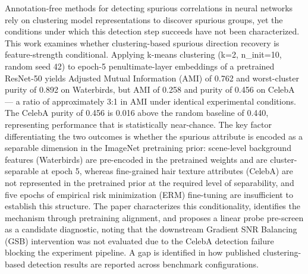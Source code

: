 
Annotation-free methods for detecting spurious correlations in neural networks rely on clustering model representations to discover spurious groups, yet the conditions under which this detection step succeeds have not been characterized. This work examines whether clustering-based spurious direction recovery is feature-strength conditional. Applying k-means clustering (k=2, n_init=10, random seed 42) to epoch-5 penultimate-layer embeddings of a pretrained ResNet-50 yields Adjusted Mutual Information (AMI) of 0.762 and worst-cluster purity of 0.892 on Waterbirds, but AMI of 0.258 and purity of 0.456 on CelebA — a ratio of approximately 3:1 in AMI under identical experimental conditions. The CelebA purity of 0.456 is 0.016 above the random baseline of 0.440, representing performance that is statistically near-chance. The key factor differentiating the two outcomes is whether the spurious attribute is encoded as a separable dimension in the ImageNet pretraining prior: scene-level background features (Waterbirds) are pre-encoded in the pretrained weights and are cluster-separable at epoch 5, whereas fine-grained hair texture attributes (CelebA) are not represented in the pretrained prior at the required level of separability, and five epochs of empirical risk minimization (ERM) fine-tuning are insufficient to establish this structure. The paper characterizes this conditionality, identifies the mechanism through pretraining alignment, and proposes a linear probe pre-screen as a candidate diagnostic, noting that the downstream Gradient SNR Balancing (GSB) intervention was not evaluated due to the CelebA detection failure blocking the experiment pipeline. A gap is identified in how published clustering-based detection results are reported across benchmark configurations.

